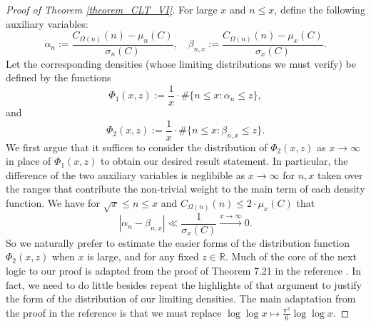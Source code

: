 \documentclass[11pt,reqno,a4letter]{article}
\numberwithin{figure}{section}
\numberwithin{table}{section}
\theoremstyle{plain}
\numberwithin{theorem}{section}
\theoremstyle{definition}
\begin{document}
\begin{proof}[Proof of Theorem \ref{theorem_CLT_VI}] 
For large $x$ and $n \leq x$, define the following auxiliary variables: 
\[
\alpha_n := \frac{C_{\Omega(n)}(n) - \mu_n(C)}{\sigma_n(C)}, \quad 
     \beta_{n,x} := \frac{C_{\Omega(n)}(n) - \mu_x(C)}{\sigma_x(C)}. 
\] 
Let the corresponding densities (whose limiting distributions we must verify) 
be defined by the functions 
\[
\Phi_1(x, z) := \frac{1}{x} \cdot \#\{n \leq x: \alpha_n \leq z\}, 
\]
and 
\[
\Phi_2(x, z) := \frac{1}{x} \cdot \#\{n \leq x: \beta_{n,x} \leq z\}. 
\] 
We first argue that it suffices to consider the distribution of $\Phi_2(x, z)$ as 
$x \rightarrow \infty$ in place of $\Phi_1(x, z)$ to obtain our desired result statement. 
In particular, the difference of the two auxiliary variables is neglibible as 
$x \rightarrow \infty$ for $n,x$ taken over the ranges that contribute the non-trivial 
weight to the main term of each density function. We have for 
$\sqrt{x} \leq n \leq x$ and $C_{\Omega(n)}(n) \leq 2 \cdot \mu_x(C)$ that 
\[
|\alpha_n - \beta_{n,x}| \ll \frac{1}{\sigma_x(C)} \xrightarrow{x \rightarrow \infty} 0. 
\]
So we naturally prefer to estimate the easier forms of the distribution function $\Phi_2(x, z)$ 
when $x$ is large, and for any fixed $z \in \mathbb{R}$. Much of the core of the next logic 
to our proof is adapted from the proof of Theorem 7.21 in the reference \cite[\S 7.4]{MV}. 
In fact, we need to do little besides repeat the highlights of that argument 
to justify the form of the distribution of our limiting densities. 
The main adaptation from the proof in the reference is that we must replace 
$\log\log x \mapsto \frac{\pi^2}{6} \log\log x$. 


\end{proof}
\end{document}

